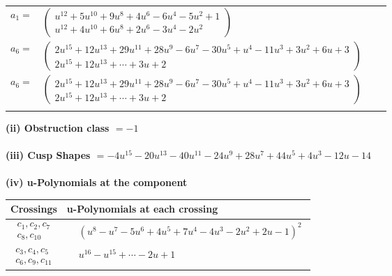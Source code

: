 \documentclass[1p]{elsarticle_modified}
\theoremstyle{definition}
\begin{document}
\begin{tabular}{m{7pt} m{180pt} m{7pt} m{180pt} }
\flushright $a_{1}=$&$\begin{pmatrix}u^{12}+5 u^{10}+9 u^8+4 u^6-6 u^4-5 u^2+1\\u^{12}+4 u^{10}+6 u^8+2 u^6-3 u^4-2 u^2\end{pmatrix}$ \\
\flushright $a_{6}=$&$\begin{pmatrix}2 u^{15}+12 u^{13}+29 u^{11}+28 u^9-6 u^7-30 u^5+u^4-11 u^3+3 u^2+6 u+3\\2 u^{15}+12 u^{13}+\cdots+3 u+2\end{pmatrix}$\\ \flushright $a_{6}=$&$\begin{pmatrix}2 u^{15}+12 u^{13}+29 u^{11}+28 u^9-6 u^7-30 u^5+u^4-11 u^3+3 u^2+6 u+3\\2 u^{15}+12 u^{13}+\cdots+3 u+2\end{pmatrix}$\\&\end{tabular}
\flushleft \textbf{(ii) Obstruction class $= -1$}\\~\\
\flushleft \textbf{(iii) Cusp Shapes $= -4 u^{15}-20 u^{13}-40 u^{11}-24 u^9+28 u^7+44 u^5+4 u^3-12 u-14$}\\~\\
\newpage\renewcommand{\arraystretch}{1}
\flushleft \textbf{(iv) u-Polynomials at the component}\newline \\
\begin{tabular}{m{50pt}|m{274pt}}
Crossings & \hspace{64pt}u-Polynomials at each crossing \\
\hline $$\begin{aligned}c_{1},c_{2},c_{7}\\c_{8},c_{10}\end{aligned}$$&$\begin{aligned}
&(u^8- u^7-5 u^6+4 u^5+7 u^4-4 u^3-2 u^2+2 u-1)^2
\end{aligned}$\\
\hline $$\begin{aligned}c_{3},c_{4},c_{5}\\c_{6},c_{9},c_{11}\end{aligned}$$&$\begin{aligned}
&u^{16}- u^{15}+\cdots-2 u+1
\end{aligned}$\\
\hline
\end{tabular}\\~\\
\end{document}
